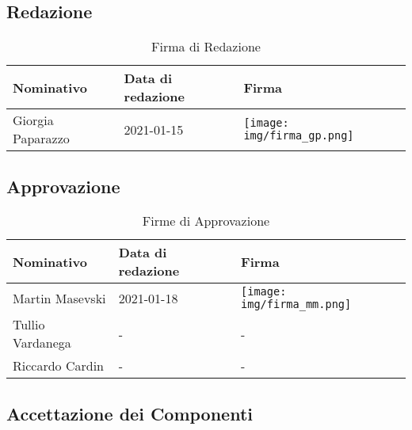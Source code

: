 \documentclass[../piano_di_progetto.tex]{subfiles}
\begin{document}
\subsection{Redazione}%
\label{sub:red}

\begin{table}[!ht]
	\centering
	\begin{tabular}{|l|l|l|}
		\hline
		\rowcolor{lightgray}
		\textbf{Nominativo} & \textbf{Data di redazione} & \textbf{Firma}\\ 
		\hline
			Giorgia Paparazzo & 2021-01-15 & \texttt{[image: img/firma\_gp.png]} \\
		\hline
	\end{tabular}
	\caption{Firma di Redazione}
\end{table}


\subsection{Approvazione}%
\label{sub:app}

\begin{table}[!ht]
	\centering
	\begin{tabular}{|l|l|l|}
		\hline
		\rowcolor{lightgray}
		\textbf{Nominativo} & \textbf{Data di redazione} & \textbf{Firma} \\ 

		\hline
			Martin Masevski & 2021-01-18 & \texttt{[image: img/firma\_mm.png]} \\ 
			Tullio Vardanega & - & - \\
			Riccardo Cardin  & - & - \\
		\hline
	\end{tabular}
		\caption{Firme di Approvazione}
\end{table}


\newpage
\subsection{Accettazione dei Componenti}%
\label{sub:acc_comp}
\end{document}
